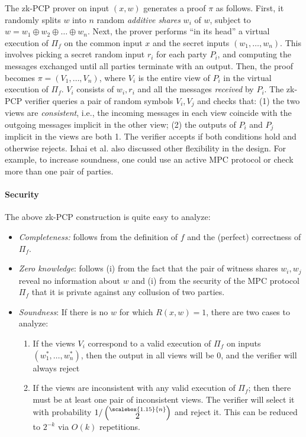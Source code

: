 The zk-PCP prover on input $(x,w)$ generates a proof $\pi$ as follows. 
First, it randomly splits $w$ into $n$ random {\em additive shares} $w_i$ of $w$, subject to $w=w_1\oplus w_2\oplus\ldots\oplus w_{n}$. 
Next, the prover performs ``in its head'' a virtual execution of $\Pi_f$ on the common input $x$ and the secret inputs $(w_1,\ldots,w_n)$. 
This involves picking a secret random input $r_i$ for each party $P_i$, and computing the messages exchanged until all parties terminate with an output. 
Then, the proof becomes $\pi=(V_1,\ldots, V_n)$, where $V_i$ is the entire view of $P_i$ in the virtual execution of $\Pi_f$. 
$V_i$ consists of $w_i,r_i$ and all the messages {\em received} by $P_i$. 
The zk-PCP verifier queries a pair of random symbols $V_i,V_j$ and checks that: (1) the two views are {\em consistent}, i.e., the incoming messages in each view coincide with the outgoing messages implicit in the other view; 
(2) the outputs of $P_i$ and $P_j$ implicit in the views are both 1. 
The verifier accepts if both conditions hold and otherwise rejects.
Ishai et al. also discussed other flexibility in the design. For example, to increase soundness, one could use an active MPC protocol or check more than one pair of parties.
\loosen


\paragraph{Security}
The above zk-PCP construction is quite easy to analyze:
\begin{itemize}[topsep=0pt] 
\item {\em Completeness:} follows from the definition of $f$ and the (perfect) correctness of $\Pi_f$. 
\item {\em Zero knowledge}: follows (i) from the fact that the pair of witness shares $w_i,w_j$ reveal no information about $w$ and (i) from the security of the MPC protocol $\Pi_f$ that it is private against any collusion of two parties.


\item {\em Soundness}: 
If there is no $w$ for which $R(x,w)=1$, there are two cases to analyze:
    \begin{enumerate}[nosep]
    \item If the views $V_i$ correspond to a valid execution of $\Pi_f$ on inputs $(w^*_1,\ldots,w^*_n)$, then the output in all views will be 0, and the verifier will always reject
    
    \item If the views are inconsistent with any valid execution of $\Pi_f$; then there must be at least one pair of inconsistent views. The verifier will select it with probability 
    $1 / \left(\rule{0pt}{2.75ex}\smash{\stackrel{\scalebox{1.15}{\ensuremath{n}}}{\raisebox{-1ex}{2}}}\right)$ 
    and reject it.
    This can be reduced to $2^{-k}$ via $O(k)$ repetitions.
    \end{enumerate}
\end{itemize}



